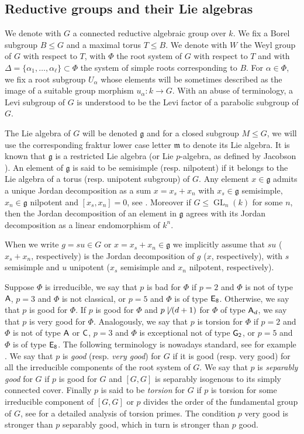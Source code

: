 \documentclass[12pt]{amsart}
\theoremstyle{definition}
\theoremstyle{remark}
\newcommand{\g}{\mathfrak{g}}
\newcommand{\m}{\mathfrak{m}}
\newcommand{\GL}{\operatorname{GL}}
\begin{document}
\subsection{Reductive groups and their Lie algebras}
We denote with $G$ a connected reductive algebraic group over $k$.
We fix a Borel subgroup $B \leq G$ and a maximal torus $T \leq B$.
We denote with $W$ the Weyl group of $G$ with respect to $T$, with $\Phi$  the root system of $G$ with respect to $T$ and with $\Delta = \{ \alpha_1, \dots, \alpha_\ell\} \subset \Phi$ the system of simple roots  corresponding to $B$. 
For $\alpha \in \Phi$, we fix a root subgroup $U_\alpha$ whose elements will be sometimes described as the image of a suitable group morphism $u_\alpha \colon k \to G$.
With an abuse of terminology, a Levi subgroup of $G$ is understood to be the Levi factor of a parabolic subgroup of $G$.

The Lie algebra of $G$ will be denoted $\g$ and for a closed subgroup $M \leq G$, we will use the corresponding fraktur lower case letter $\m$ to denote its Lie algebra. 
It is known that $\g$ is a restricted Lie algebra (or Lie $p$-algebra, as defined by Jacobson \cite{Jacobson}).
An element of $\g$ is said to be semisimple (resp. nilpotent) if it belongs to the Lie algebra of a  torus (resp. unipotent subgroup) of $G$.
Any element $x \in \g$ admits a unique Jordan decomposition as a sum $x = x_s + x_n$ with $x_s \in \g$ semisimple, $x_n \in \g$ nilpotent and $[x_s , x_n] = 0$, see \cite{Bo}.
Moreover if $G \leq \GL_n(k)$ for some $n$, then the Jordan decomposition of an element in $\g$ agrees with its Jordan decomposition  as a linear endomorphism of $k^n$.

When we write $g = su \in G$ or $x = x_s + x_n \in \g$ we implicitly assume that
$su$ ($x_s +x_n$, respectively) is the Jordan decomposition of $g$ ($x$, respectively), with
$s$ semisimple and $u$ unipotent ($x_s$ semisimple and $x_n$ nilpotent, respectively).

Suppose $\Phi$ is irreducible, we say that $p$ is bad for $\Phi$ if $p =2$ and $\Phi$ is not of type $\sf A$, $p=3$ and $\Phi$ is not classical, or $p=5$ and $\Phi$ is of type $\sf E_8$. Otherwise, we say that $p$ is good for $\Phi$. If  $p$ is good for $\Phi$ and $p \not\mid (d +1)$ for $\Phi$ of type ${\sf A}_d$, we say that $p$ is very good for $\Phi$.
Analogously, we say that $p$ is torsion for $\Phi$ if $p = 2$ and $\Phi$ is not of type $\sf A$ or $\sf C$, $p = 3$ and $\Phi$ is exceptional not of type $\sf G_2$, or $p = 5$ and $\Phi$ is of type $\sf E_8$.
The following terminology is nowadays standard, see for example \cite[\S 14]{MalleTesterman}.
We say that $p$ is \emph{good} (resp. \emph{very good}) for $G$ if it is good (resp. very good) for all the irreducible components of the root system of $G$. 
We say that $p$ is \emph{separably good} for $G$ if $p$ is good for $G$ and $[G,G]$ is separably isogenous to its simply connected cover.
Finally 
$p$ is said to be \emph{torsion} for $G$ if $p$ is torsion for some 
irreducible component of $[G,G]$ or $p$ divides the order of the fundamental group of $G$, see \cite{St} for a detailed analysis of torsion primes.
The condition $p$ very good is stronger than $p$ separably good, which in turn is stronger than $p$ good.
\end{document}
